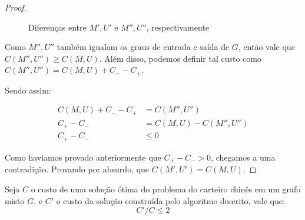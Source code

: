 \begin{proof}
\begin{figure}[H]
\begin{minipage}{.5\textwidth}
            \end{minipage}%
            \caption{Diferenças entre $M', U'$ e $M'', U''$, respectivamente}
            \label{fig:mixed-ex-lema}
        \end{figure}

        Como $M'', U''$ também igualam os graus de entrada e saída de $G$, então vale que $C(M'', U'') \geq C(M, U)$.
        Além disso, podemos definir tal custo como $C(M'', U'') = C(M, U) + C_- - C_+$.
        
        Sendo assim:

        \begin{align*}
            C(M, U) + C_- - C_+ &= C(M'', U'') \\
            C_+ - C_- &= C(M, U) - C(M'', U'') \\
            C_+ - C_- &\leq 0 
        \end{align*}

        Como haviamos provado anteriormente que $C_+ - C_- > 0$, chegamos a uma contradição.
        Provando por absurdo, que $C(M', U') = C(M, U)$.
    \end{proof}

    \begin{theorem}{\cite{frederickson}}
        Seja $C$ o custo de uma solução ótima do problema do carteiro chinês em um grafo misto $G$, e $C'$ o custo da solução construída pelo algoritmo descrito, vale que:
        \[
            C'/C \leq 2
        \]
    \end{theorem}

